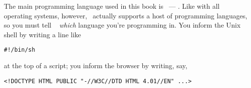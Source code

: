 
The main programming language used in this book is
\ --- 
\href{http://www.racket-lang.org/}{\racket}.
Like with all operating systems, however,
\racket\ actually supports a host of programming languages,
so you must tell \racket\
\emph{which} language you’re programming in.
You inform the Unix shell by writing a line like

\begin{verbatim}
#!/bin/sh
\end{verbatim}
at the top of a script;
you inform the browser by writing, say,

\begin{verbatim}
<!DOCTYPE HTML PUBLIC "-//W3C//DTD HTML 4.01//EN" ...>
\end{verbatim}

